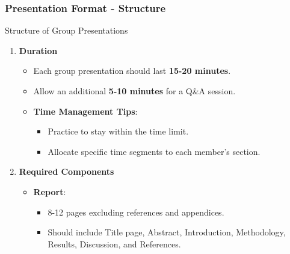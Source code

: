 \documentclass{beamer}
\begin{document}
\begin{frame}[fragile]
    \frametitle{Presentation Format - Structure}
    \begin{block}{Structure of Group Presentations}
        \begin{enumerate}
            \item \textbf{Duration}
            \begin{itemize}
                \item Each group presentation should last \textbf{15-20 minutes}.
                \item Allow an additional \textbf{5-10 minutes} for a Q\&A session.
                \item \textbf{Time Management Tips}:
                \begin{itemize}
                    \item Practice to stay within the time limit.
                    \item Allocate specific time segments to each member’s section.
                \end{itemize}
            \end{itemize}

            \item \textbf{Required Components} 
            \begin{itemize}
                \item \textbf{Report}: 
                \begin{itemize}
                    \item 8-12 pages excluding references and appendices.
                    \item Should include Title page, Abstract, Introduction, Methodology, Results, Discussion, and References.
                \end{itemize}
            \end{itemize}
        \end{enumerate}
    \end{block}
\end{frame}
\end{document}
